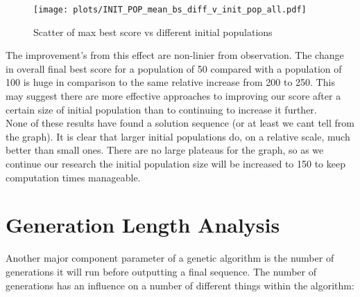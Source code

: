 \begin{figure}[h]
    \texttt{[image: plots/INIT\_POP\_mean\_bs\_diff\_v\_init\_pop\_all.pdf]}
    \caption{Scatter of max best score vs different initial populations}\label{fig:INIT-POP-mean-bs-v-init-pop-all}
\end{figure}

The improvement's from this effect are non-linier from observation.
The change in overall final best score for a population of 50 compared with a population of 100 is huge in comparison to the same relative increase from 200 to 250.
This may suggest there are more effective approaches to improving our score after a certain size of initial population than to continuing to increase it further. \\



None of these results have found a solution sequence (or at least we cant tell from the graph).
It is clear that larger initial populations do, on a relative scale, much better than small ones.
There are no large plateaus for the graph, so as we continue our research the initial population size will be increased to 150 to keep computation times manageable.\\


\section{Generation Length Analysis}\label{sec:generationlengthanalysis}
Another major component parameter of a genetic algorithm is the number of generations it will run before outputting a final sequence.
The number of generations has an influence on a number of different things within the algorithm:

